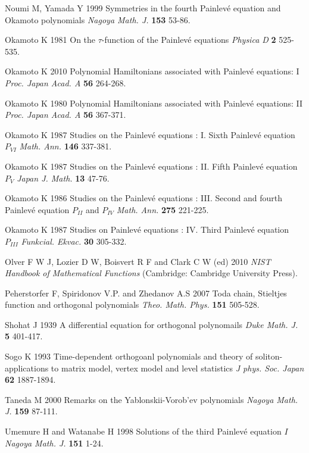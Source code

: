 \documentclass[12pt]{article}
\def\P{Painlev\'e }
\numberwithin{figure}{section}
\numberwithin{equation}{section}
\numberwithin{table}{section}
\begin{document}
\begin{thebibliography}{9}
  {Noumi M, Yamada Y} 1999 {Symmetries in the fourth \P equation and Okamoto polynomials} {\it{Nagoya Math. J.}} {\bf{153}} 53-86.

  {Okamoto K} 1981 On the $\tau$-function of the \P equations {\it{Physica D}} {\bf{2}}  525-535.

  {Okamoto K} 2010 {Polynomial Hamiltonians associated with \P equations: I} {\it{Proc. Japan Acad. A}} {\bf{56}} 264-268.

  {Okamoto K} 1980 {Polynomial Hamiltonians associated with \P equations: II} {\it{Proc. Japan Acad. A}} {\bf{56}} 367-371.

  {Okamoto K} 1987 {Studies on the \P equations : I. Sixth Painlev\'e equation $P_{VI}$} {\it{Math. Ann.}} {\bf{146}} 337-381.

  {Okamoto K} 1987 {Studies on the \P equations : II. Fifth Painlev\'e equation $P_V$} {\it{Japan J. Math.}} {\bf{13}} 47-76.

  {Okamoto K} 1986 {Studies on the \P equations : III. Second and fourth Painlev\'e equation $P_{II}$ and $P_{IV}$} {\it{Math. Ann.}} {\bf{275}} 221-225.

  {Okamoto K} 1987 {Studies on \P equations : IV. Third Painlev\'e equation $P_{III}$} {\it{Funkcial. Ekvac.}} {\bf{30}} 305-332.

  {Olver F W J, Lozier D W, Boisvert R F and Clark C W} (ed) 2010 {\it{NIST Handbook of Mathematical Functions}} (Cambridge: Cambridge
  University Press).

  {Peherstorfer F, Spiridonov V.P. and Zhedanov A.S} 2007 {Toda chain, Stieltjes function and orthogonal polynomials} {\it{Theo. Math.
Phys.}} {\bf{151}} 505-528.

  {Shohat J} 1939 {A differential equation for orthogonal polynomails} {\it{Duke Math. J.}} {\bf{5}} 401-417.

  {Sogo K} 1993 {Time-dependent orthogoanl polynomials and theory of soliton-applications to matrix model, vertex model and level statistics}
  {\it{J phys. Soc. Japan}} {\bf{62}} 1887-1894.

  {Taneda M} 2000 {Remarks on the Yablonskii-Vorob’ev polynomials}
  {\it{Nagoya Math. J.}} {\bf{159}} 87-111.

  {Umemure H and Watanabe H} 1998 Solutions of the third \P equation $I$ {\it{Nagoya Math. J.}} {\bf{151}} 1-24.



\end{thebibliography}
\end{document}
